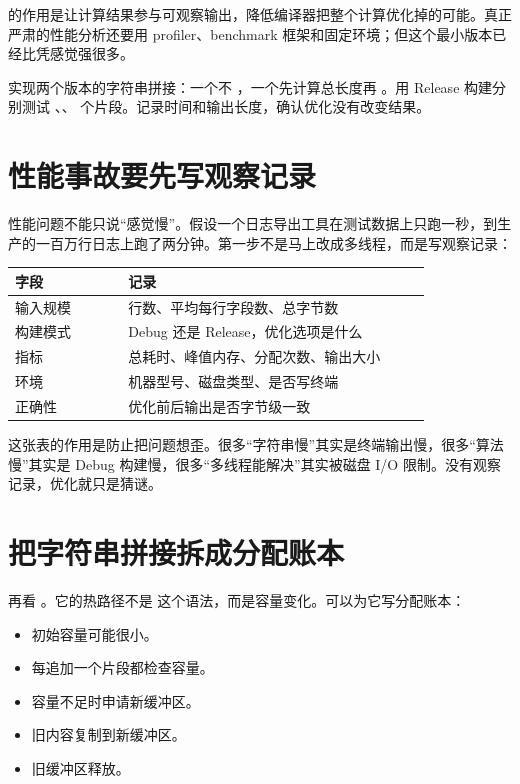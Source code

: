  的作用是让计算结果参与可观察输出，降低编译器把整个计算优化掉的可能。真正严肃的性能分析还要用 profiler、benchmark 框架和固定环境；但这个最小版本已经比凭感觉强很多。

\begin{exercisebox}
实现两个版本的字符串拼接：一个不 ，一个先计算总长度再 。用 Release 构建分别测试 、、 个片段。记录时间和输出长度，确认优化没有改变结果。
\end{exercisebox}

\section{性能事故要先写观察记录}

性能问题不能只说“感觉慢”。假设一个日志导出工具在测试数据上只跑一秒，到生产的一百万行日志上跑了两分钟。第一步不是马上改成多线程，而是写观察记录：

\begin{longtable}{p{0.24\linewidth}p{0.64\linewidth}}
\toprule
字段 & 记录 \\
\midrule
输入规模 & 行数、平均每行字段数、总字节数 \\
构建模式 & Debug 还是 Release，优化选项是什么 \\
指标 & 总耗时、峰值内存、分配次数、输出大小 \\
环境 & 机器型号、磁盘类型、是否写终端 \\
正确性 & 优化前后输出是否字节级一致 \\
\bottomrule
\end{longtable}

这张表的作用是防止把问题想歪。很多“字符串慢”其实是终端输出慢，很多“算法慢”其实是 Debug 构建慢，很多“多线程能解决”其实被磁盘 I/O 限制。没有观察记录，优化就只是猜谜。

\section{把字符串拼接拆成分配账本}

再看 。它的热路径不是  这个语法，而是容量变化。可以为它写分配账本：

\begin{itemize}
  \item 初始容量可能很小。
  \item 每追加一个片段都检查容量。
  \item 容量不足时申请新缓冲区。
  \item 旧内容复制到新缓冲区。
  \item 旧缓冲区释放。
\end{itemize}

